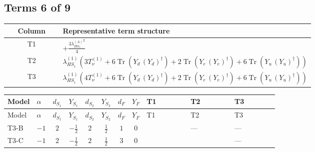 \documentclass[8pt]{article}
\begin{document}
\begin{landscape}
\subsection*{Terms 6 of 9}
\begin{center}
\begin{tabular}{@{}c >{\raggedright\arraybackslash}p{0.82\linewidth}@{}}
\toprule
Column & Representative term structure \\
\midrule
T1 & \(\displaystyle +\frac{3 {\lambda_{HS_1}^{(A)}}^2}{4}\) \\
\midrule
T2 & \(\displaystyle {\lambda_{HS_1}^{(1)}} (3 T_{\nu}^{(1)}+6 \operatorname{Tr}\!\left({Y_d}\,\left({Y_d}\right)^{\dagger}\right)+2 \operatorname{Tr}\!\left({Y_e}\,\left({Y_e}\right)^{\dagger}\right)+6 \operatorname{Tr}\!\left({Y_u}\,\left({Y_u}\right)^{\dagger}\right))\) \\
\midrule
T3 & \(\displaystyle {\lambda_{HS_1}^{(1)}} (4 T_{\nu}^{(1)}+6 \operatorname{Tr}\!\left({Y_d}\,\left({Y_d}\right)^{\dagger}\right)+2 \operatorname{Tr}\!\left({Y_e}\,\left({Y_e}\right)^{\dagger}\right)+6 \operatorname{Tr}\!\left({Y_u}\,\left({Y_u}\right)^{\dagger}\right))\) \\
\midrule
\bottomrule
\end{tabular}
\end{center}
\smallskip
\tiny
\begin{longtable}{@{}llcccccc >{\raggedright\arraybackslash}p{0.21\linewidth} >{\raggedright\arraybackslash}p{0.21\linewidth} >{\raggedright\arraybackslash}p{0.21\linewidth}@{}}
\toprule
Model & $\alpha$ & $d_{S_1}$ & $Y_{S_1}$ & $d_{S_2}$ & $Y_{S_2}$ & $d_F$ & $Y_F$ & T1 & T2 & T3 \\
\midrule
\endfirsthead
\toprule
Model & $\alpha$ & $d_{S_1}$ & $Y_{S_1}$ & $d_{S_2}$ & $Y_{S_2}$ & $d_F$ & $Y_F$ & T1 & T2 & T3 \\
\midrule
\endhead
T3-B & $-1$ & $2$ & $-\frac{1}{2}$ & $2$ & $\frac{1}{2}$ & $1$ & $0$ & \scriptsize\adjustbox{max width=\linewidth}{$\begin{gathered} +\frac{3 {\lambda_{HS_1}^{(A)}}^2}{4}\end{gathered}$} & --- & --- \\
\midrule
T3-C & $-1$ & $2$ & $-\frac{1}{2}$ & $2$ & $\frac{1}{2}$ & $3$ & $0$ & \scriptsize\adjustbox{max width=\linewidth}{$\begin{gathered} +\frac{3 {\lambda_{HS_1}^{(A)}}^2}{4}\end{gathered}$} & \scriptsize\adjustbox{max width=\linewidth}{$\begin{gathered} {\lambda_{HS_1}^{(1)}} (3 T_{\nu}^{(1)}+6 \operatorname{Tr}\!\left({Y_d}\,\left({Y_d}\right)^{\dagger}\right)+2 \operatorname{Tr}\!\left({Y_e}\,\left({Y_e}\right)^{\dagger}\right)+6 \operatorname{Tr}\!\left({Y_u}\,\left({Y_u}\right)^{\dagger}\right))\end{gathered}$} & --- \\

\end{longtable}
\end{landscape}
\end{document}

